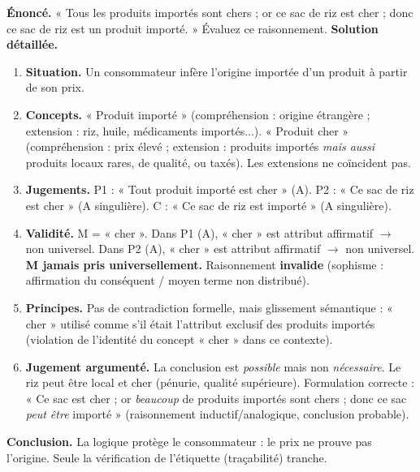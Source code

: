 \documentclass[11pt]{article}
\begin{document}
\begin{exoresolu}
\textbf{Énoncé.} « Tous les produits importés sont chers ; or ce sac de riz est cher ; donc ce sac de riz est un produit importé. » Évaluez ce raisonnement.
\tcblower
\textbf{Solution détaillée.}
\begin{enumerate}
\item \textbf{Situation.} Un consommateur infère l'origine importée d'un produit à partir de son prix.
\item \textbf{Concepts.} « Produit importé » (compréhension : origine étrangère ; extension : riz, huile, médicaments importés...). « Produit cher » (compréhension : prix élevé ; extension : produits importés \emph{mais aussi} produits locaux rares, de qualité, ou taxés). Les extensions ne coïncident pas.
\item \textbf{Jugements.} P1 : « Tout produit importé est cher » (A). P2 : « Ce sac de riz est cher » (A singulière). C : « Ce sac de riz est importé » (A singulière).
\item \textbf{Validité.} M = « cher ». Dans P1 (A), « cher » est attribut affirmatif $\rightarrow$ non universel. Dans P2 (A), « cher » est attribut affirmatif $\rightarrow$ non universel. \textbf{M jamais pris universellement.} Raisonnement \textbf{invalide} (sophisme : affirmation du conséquent / moyen terme non distribué).
\item \textbf{Principes.} Pas de contradiction formelle, mais glissement sémantique : « cher » utilisé comme s'il était l'attribut exclusif des produits importés (violation de l'identité du concept « cher » dans ce contexte).
\item \textbf{Jugement argumenté.} La conclusion est \emph{possible} mais non \emph{nécessaire}. Le riz peut être local et cher (pénurie, qualité supérieure). Formulation correcte : « Ce sac est cher ; or \emph{beaucoup} de produits importés sont chers ; donc ce sac \emph{peut être} importé » (raisonnement inductif/analogique, conclusion probable).
\end{enumerate}
\textbf{Conclusion.} La logique protège le consommateur : le prix ne prouve pas l'origine. Seule la vérification de l'étiquette (traçabilité) tranche.
\end{exoresolu}
\end{document}

